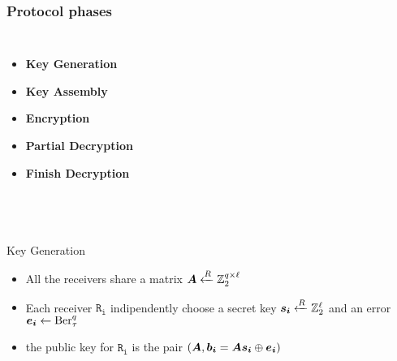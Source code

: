 \begin{frame}
\frametitle{Protocol phases}
  \begin{columns}[c]
  \begin{itemize}
 \item<1> \alert<1,1>{ \textbf{Key Generation} }
 \item<2> \alert<2,2>{ \textbf{Key Assembly} }
 \item<3-5> \alert<3-5>{ \textbf{Encryption} }
 \item<6-10> \alert<6-10>{ \textbf{Partial Decryption} } 
 \item<11> \alert<11,11>{ \textbf{Finish Decryption} }
 \end{itemize} 
\begin{overprint}
  \begin{center}\end{center}
  \begin{center}\end{center}
  \begin{center}\end{center}
  \begin{center}\end{center}
  \begin{center}\end{center}
\end{overprint}

\end{columns}
\\
 
   \begin{overprint}
 \begin{block}{Key Generation}
  \begin{itemize}
   \item All the receivers share a matrix $\boldsymbol{A}  \xleftarrow{R} \mathbb{Z}_2^{q \times \ell}$
   \item Each receiver $\mathtt{R_i}$ \alert{indipendently} choose a secret key $\boldsymbol{s_i} \xleftarrow{R} \mathbb{Z}_2^{\ell}$ and an error $\boldsymbol{e_i} \gets \mathrm{Ber}_{\tau}^{q}$
   \item the public key for $\mathtt{R_i}$ is the pair $\left( \boldsymbol{A},\boldsymbol{b_i}=\boldsymbol{A}\boldsymbol{s_i} \mathbin{\oplus} \boldsymbol{e_i} \right)$
  \end{itemize}  
  \end{block}
  

\end{overprint}
\end{frame}
